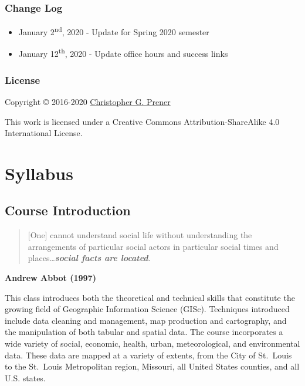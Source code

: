 \documentclass[
]{book}
\providecommand{\tightlist}{%
  \setlength{\itemsep}{0pt}\setlength{\parskip}{0pt}}
\begin{document}
\hypertarget{change-log}{%
\section*{Change Log}\label{change-log}}

\begin{itemize}
\tightlist
\item
  January 2\textsuperscript{nd}, 2020 - Update for Spring 2020 semester
\item
  January 12\textsuperscript{th}, 2020 - Update office hours and success links
\end{itemize}

\hypertarget{license}{%
\section*{License}\label{license}}

Copyright © 2016-2020 \href{https://chris-prener.github.io}{Christopher G. Prener}

This work is licensed under a Creative Commons Attribution-ShareAlike 4.0 International License.

\hypertarget{part-syllabus}{%
\part{Syllabus}\label{part-syllabus}}

\hypertarget{course-introduction}{%
\chapter{Course Introduction}\label{course-introduction}}

\begin{quote}
{[}One{]} cannot understand social life without understanding the arrangements of particular social actors in particular social times and places\ldots{}\textbf{\emph{social facts are located}}.
\end{quote}

\textbf{Andrew Abbot (1997)}

This class introduces both the theoretical and technical skills that constitute the growing field of Geographic Information Science (GISc). Techniques introduced include data cleaning and management, map production and cartography, and the manipulation of both tabular and spatial data. The course incorporates a wide variety of social, economic, health, urban, meteorological, and environmental data. These data are mapped at a variety of extents, from the City of St.~Louis to the St.~Louis Metropolitan region, Missouri, all United States counties, and all U.S. states.
\end{document}
